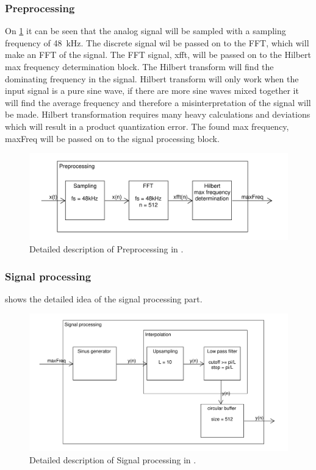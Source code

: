 \subsubsection{Preprocessing}
On \cref{fig:DetailedPrePro} it can be seen that the analog signal will be sampled with a sampling frequency of \SI{48}{\kilo\hertz}.
The discrete signal wil be passed on to the FFT, which will make an FFT of the signal.
The FFT signal, xfft, will be passed on to the Hilbert max frequency determination block.
The Hilbert transform will find the dominating frequency in the signal.
Hilbert transform will only work when the input signal is a pure sine wave, if there are more sine waves mixed together it will find the average frequency and therefore a misinterpretation of the signal will be made.
Hilbert transformation requires many heavy calculations and deviations which will result in a product quantization error.
The found max frequency, maxFreq will be passed on to the signal processing block.

\begin{figure}
	\centering
	\includegraphics[width=1\linewidth]{gfx/Design/DesignPrePro_IF.pdf}
	\caption{Detailed description of Preprocessing in \systemName.}
	\label{fig:DetailedPrePro}
\end{figure}

\subsubsection{Signal processing}
 shows the detailed idea of the signal processing part.

\begin{figure}
	\centering
	\includegraphics[width=1\linewidth]{gfx/Design/DesignSigPro_IF.pdf}
	\caption{Detailed description of Signal processing in \systemName.}
	\label{fig:DetailedSigPro}
\end{figure}

